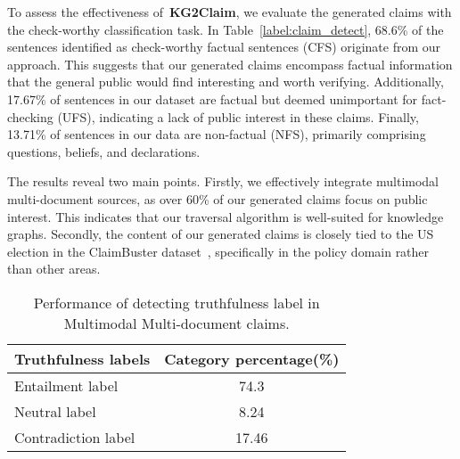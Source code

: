 To assess the effectiveness of~\textbf{KG2Claim}, we evaluate the generated claims with the check-worthy classification task. In Table~\ref{label:claim_detect}, 68.6\% of the sentences identified as check-worthy factual sentences (CFS) originate from our approach. This suggests that our generated claims encompass factual information that the general public would find interesting and worth verifying. Additionally, 17.67\% of sentences in our dataset are factual but deemed unimportant for fact-checking (UFS), indicating a lack of public interest in these claims. Finally, 13.71\% of sentences in our data are non-factual (NFS), primarily comprising questions, beliefs, and declarations. 

The results reveal two main points. Firstly, we effectively integrate multimodal multi-document sources, as over 60\% of our generated claims focus on public interest. This indicates that our traversal algorithm is well-suited for knowledge graphs. Secondly, the content of our generated claims is closely tied to the US election in the ClaimBuster dataset~\cite{arslan2020benchmark}, specifically in the policy domain rather than other areas.

\begin{table}[h]\Large
\centering
\caption{Performance of detecting truthfulness label in Multimodal Multi-document claims.}
\begin{tabular}{l|c}
\hline
\textbf{Truthfulness labels}                    & \textbf{Category percentage(\%)}  \\\hline
Entailment label &  74.3  \\
Neutral label &   8.24     \\
Contradiction label &  17.46 \\\hline
\end{tabular}
\label{label:claim_label}
\end{table}